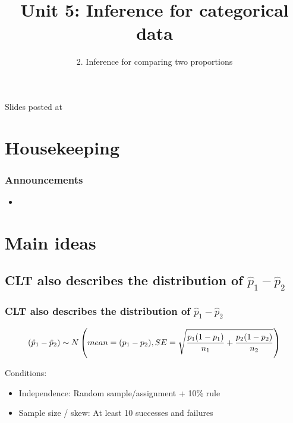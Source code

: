 \documentclass[slidestop,compress,mathserif,12pt,t,professionalfonts,xcolor=table]{beamer}
\title{Unit 5: Inference for categorical data}
\subtitle{2. Inference for comparing two proportions}
\author{\CourseName}
\date{}
\institute{\InstituteName}
\begin{document}



\begin{frame}[plain]

\titlepage

\vfill

{\scriptsize {} \hfill Slides posted at  \webURL{\CourseSite}}

\addtocounter{framenumber}{-1} 

\end{frame}


\section{Housekeeping}


\begin{frame}
\frametitle{Announcements}

\begin{itemize}

\item 

\end{itemize}

\end{frame}


\section{Main ideas}


\subsection{CLT also describes the distribution of $\hat{p}_1 - \hat{p}_2$}
\label{mi1}


\begin{frame}
\frametitle{CLT also describes the distribution of $\hat{p}_1 - \hat{p}_2$}

\[ (\hat{p}_1 - \hat{p}_2) \sim N \left(  mean = (p_1 - p_2), SE = \sqrt{ \frac{p_1(1-p_1)}{n_1} + \frac{p_2(1-p_2)}{n_2} }  \right) \]

Conditions:
\begin{itemize}
\item Independence: Random sample/assignment + 10\% rule
\item Sample size / skew: At least 10 successes and failures
\end{itemize}

\end{frame}
\end{document}
